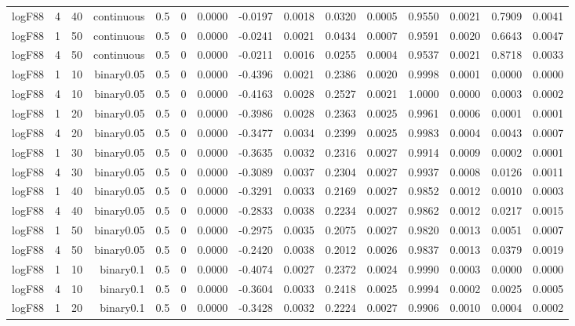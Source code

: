 \begin{longtable}{rrrrrrrrrrrrrrr}
  logF88 & 4 & 40 & continuous & 0.5 & 0 & 0.0000 & -0.0197 & 0.0018 & 0.0320 & 0.0005 & 0.9550 & 0.0021 & 0.7909 & 0.0041 \\ 
  logF88 & 1 & 50 & continuous & 0.5 & 0 & 0.0000 & -0.0241 & 0.0021 & 0.0434 & 0.0007 & 0.9591 & 0.0020 & 0.6643 & 0.0047 \\ 
  logF88 & 4 & 50 & continuous & 0.5 & 0 & 0.0000 & -0.0211 & 0.0016 & 0.0255 & 0.0004 & 0.9537 & 0.0021 & 0.8718 & 0.0033 \\ 
  logF88 & 1 & 10 & binary0.05 & 0.5 & 0 & 0.0000 & -0.4396 & 0.0021 & 0.2386 & 0.0020 & 0.9998 & 0.0001 & 0.0000 & 0.0000 \\ 
  logF88 & 4 & 10 & binary0.05 & 0.5 & 0 & 0.0000 & -0.4163 & 0.0028 & 0.2527 & 0.0021 & 1.0000 & 0.0000 & 0.0003 & 0.0002 \\ 
  logF88 & 1 & 20 & binary0.05 & 0.5 & 0 & 0.0000 & -0.3986 & 0.0028 & 0.2363 & 0.0025 & 0.9961 & 0.0006 & 0.0001 & 0.0001 \\ 
  logF88 & 4 & 20 & binary0.05 & 0.5 & 0 & 0.0000 & -0.3477 & 0.0034 & 0.2399 & 0.0025 & 0.9983 & 0.0004 & 0.0043 & 0.0007 \\ 
  logF88 & 1 & 30 & binary0.05 & 0.5 & 0 & 0.0000 & -0.3635 & 0.0032 & 0.2316 & 0.0027 & 0.9914 & 0.0009 & 0.0002 & 0.0001 \\ 
  logF88 & 4 & 30 & binary0.05 & 0.5 & 0 & 0.0000 & -0.3089 & 0.0037 & 0.2304 & 0.0027 & 0.9937 & 0.0008 & 0.0126 & 0.0011 \\ 
  logF88 & 1 & 40 & binary0.05 & 0.5 & 0 & 0.0000 & -0.3291 & 0.0033 & 0.2169 & 0.0027 & 0.9852 & 0.0012 & 0.0010 & 0.0003 \\ 
  logF88 & 4 & 40 & binary0.05 & 0.5 & 0 & 0.0000 & -0.2833 & 0.0038 & 0.2234 & 0.0027 & 0.9862 & 0.0012 & 0.0217 & 0.0015 \\ 
  logF88 & 1 & 50 & binary0.05 & 0.5 & 0 & 0.0000 & -0.2975 & 0.0035 & 0.2075 & 0.0027 & 0.9820 & 0.0013 & 0.0051 & 0.0007 \\ 
  logF88 & 4 & 50 & binary0.05 & 0.5 & 0 & 0.0000 & -0.2420 & 0.0038 & 0.2012 & 0.0026 & 0.9837 & 0.0013 & 0.0379 & 0.0019 \\ 
  logF88 & 1 & 10 & binary0.1 & 0.5 & 0 & 0.0000 & -0.4074 & 0.0027 & 0.2372 & 0.0024 & 0.9990 & 0.0003 & 0.0000 & 0.0000 \\ 
  logF88 & 4 & 10 & binary0.1 & 0.5 & 0 & 0.0000 & -0.3604 & 0.0033 & 0.2418 & 0.0025 & 0.9994 & 0.0002 & 0.0025 & 0.0005 \\ 
  logF88 & 1 & 20 & binary0.1 & 0.5 & 0 & 0.0000 & -0.3428 & 0.0032 & 0.2224 & 0.0027 & 0.9906 & 0.0010 & 0.0004 & 0.0002 \\ 

\end{longtable}
